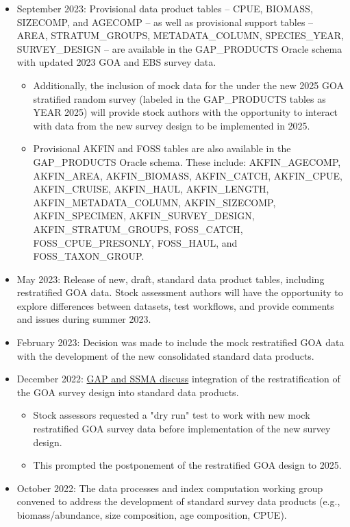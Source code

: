 \documentclass[
  letterpaper,
  oneside,
  open=any]{scrbook}
\begin{document}
\begin{itemize}
\item
  September 2023: Provisional data product tables -- CPUE, BIOMASS,
  SIZECOMP, and AGECOMP -- as well as provisional support tables --
  AREA, STRATUM\_GROUPS, METADATA\_COLUMN, SPECIES\_YEAR, SURVEY\_DESIGN
  -- are available in the GAP\_PRODUCTS Oracle schema with updated 2023
  GOA and EBS survey data.

  \begin{itemize}
  \item
    Additionally, the inclusion of mock data for the under the new 2025
    GOA stratified random survey (labeled in the GAP\_PRODUCTS tables as
    YEAR 2025) will provide stock authors with the opportunity to
    interact with data from the new survey design to be implemented in
    2025.
  \item
    Provisional AKFIN and FOSS tables are also available in the
    GAP\_PRODUCTS Oracle schema. These include: AKFIN\_AGECOMP,
    AKFIN\_AREA, AKFIN\_BIOMASS, AKFIN\_CATCH, AKFIN\_CPUE,
    AKFIN\_CRUISE, AKFIN\_HAUL, AKFIN\_LENGTH, AKFIN\_METADATA\_COLUMN,
    AKFIN\_SIZECOMP, AKFIN\_SPECIMEN, AKFIN\_SURVEY\_DESIGN,
    AKFIN\_STRATUM\_GROUPS, FOSS\_CATCH, FOSS\_CPUE\_PRESONLY,
    FOSS\_HAUL, and FOSS\_TAXON\_GROUP.
  \end{itemize}
\item
  May 2023: Release of new, draft, standard data product tables,
  including restratified GOA data. Stock assessment authors will have
  the opportunity to explore differences between datasets, test
  workflows, and provide comments and issues during summer 2023.
\item
  February 2023: Decision was made to include the mock restratified GOA
  data with the development of the new consolidated standard data
  products.
\item
  December 2022:
  \href{https://docs.google.com/document/d/1AURrvC1na6TL1Um3p7018svBLDOnih_7nxxyRU34M0k/edit}{GAP
  and SSMA discuss} integration of the restratification of the GOA
  survey design into standard data products.

  \begin{itemize}
  \item
    Stock assessors requested a "dry run" test to work with new mock
    restratified GOA survey data before implementation of the new survey
    design.
  \item
    This prompted the postponement of the restratified GOA design to
    2025.
  \end{itemize}
\item
  October 2022: The data processes and index computation working group
  convened to address the development of standard survey data products
  (e.g., biomass/abundance, size composition, age composition, CPUE).


\end{itemize}
\end{document}

